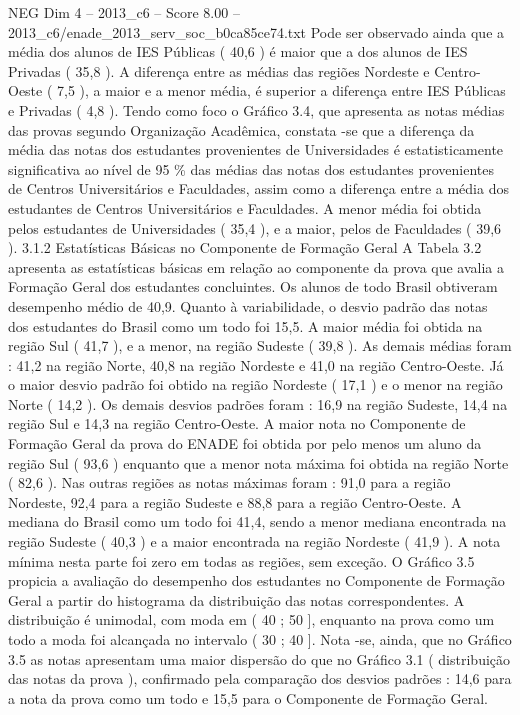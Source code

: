 \begin{textsample}{NEG Dim 4 – 2013\_c6 – Score 8.00 – 2013\_c6/enade\_2013\_serv\_soc\_b0ca85ce74.txt}
Pode ser observado ainda que a média dos alunos de IES Públicas ( 40,6 ) é maior que a dos alunos de IES Privadas ( 35,8 ).
A diferença entre as médias das regiões Nordeste e Centro-Oeste ( 7,5 ), a maior e a menor média, é superior a diferença entre IES Públicas e Privadas ( 4,8 ).
Tendo como foco o Gráfico 3.4, que apresenta as notas médias das provas segundo Organização Acadêmica, constata -se que a diferença da média das notas dos estudantes provenientes de Universidades é estatisticamente significativa ao nível de 95 \% das médias das notas dos estudantes provenientes de Centros Universitários e Faculdades, assim como a diferença entre a média dos estudantes de Centros Universitários e Faculdades.
A menor média foi obtida pelos estudantes de Universidades ( 35,4 ), e a maior, pelos de Faculdades ( 39,6 ). 3.1.2 Estatísticas Básicas no Componente de Formação Geral A Tabela 3.2 apresenta as estatísticas básicas em relação ao componente da prova que avalia a Formação Geral dos estudantes concluintes.
Os alunos de todo Brasil obtiveram desempenho médio de 40,9.
Quanto à variabilidade, o desvio padrão das notas dos estudantes do Brasil como um todo foi 15,5.
A maior média foi obtida na região Sul ( 41,7 ), e a menor, na região Sudeste ( 39,8 ).
As demais médias foram : 41,2 na região Norte, 40,8 na região Nordeste e 41,0 na região Centro-Oeste.
Já o maior desvio padrão foi obtido na região Nordeste ( 17,1 ) e o menor na região Norte ( 14,2 ).
Os demais desvios padrões foram : 16,9 na região Sudeste, 14,4 na região Sul e 14,3 na região Centro-Oeste.
A maior nota no Componente de Formação Geral da prova do ENADE foi obtida por pelo menos um aluno da região Sul ( 93,6 ) enquanto que a menor nota máxima foi obtida na região Norte ( 82,6 ).
Nas outras regiões as notas máximas foram : 91,0 para a região Nordeste, 92,4 para a região Sudeste e 88,8 para a região Centro-Oeste.
A mediana do Brasil como um todo foi 41,4, sendo a menor mediana encontrada na região Sudeste ( 40,3 ) e a maior encontrada na região Nordeste ( 41,9 ).
A nota mínima nesta parte foi zero em todas as regiões, sem exceção.
O Gráfico 3.5 propicia a avaliação do desempenho dos estudantes no Componente de Formação Geral a partir do histograma da distribuição das notas correspondentes.
A distribuição é unimodal, com moda em ( 40 ; 50 ], enquanto na prova como um todo a moda foi alcançada no intervalo ( 30 ; 40 ].
Nota -se, ainda, que no Gráfico 3.5 as notas apresentam uma maior dispersão do que no Gráfico 3.1 ( distribuição das notas da prova ), confirmado pela comparação dos desvios padrões : 14,6 para a nota da prova como um todo e 15,5 para o Componente de Formação Geral.

\end{textsample}
